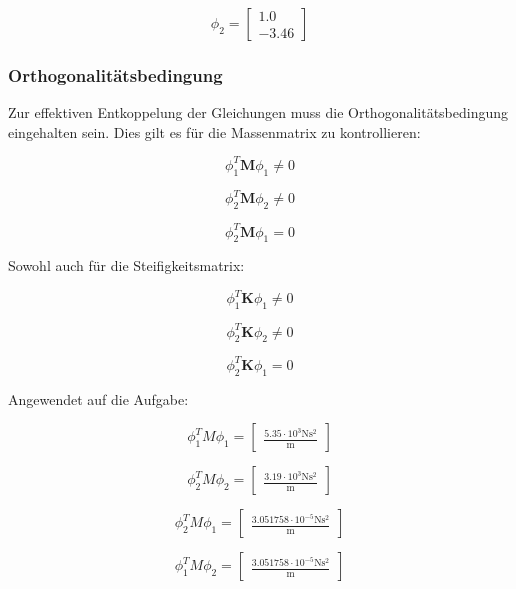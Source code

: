 \documentclass[
  letterpaper,
  DIV=11]{scrreprt}
\begin{document}
\begin{equation*}\phi_{2} = \left[\begin{matrix}1.0\\-3.46\end{matrix}\right]\end{equation*}

\hypertarget{orthogonalituxe4tsbedingung-1}{%
\subsubsection{Orthogonalitätsbedingung}\label{orthogonalituxe4tsbedingung-1}}

Zur effektiven Entkoppelung der Gleichungen muss die
Orthogonalitätsbedingung eingehalten sein. Dies gilt es für die
Massenmatrix zu kontrollieren:

\[\phi_1^T \mathbf{ M } \phi_1 \neq 0\]

\[\phi_2^T \mathbf{ M } \phi_2 \neq 0\]

\[\phi_2^T \mathbf{ M } \phi_1 = 0\]

Sowohl auch für die Steifigkeitsmatrix:

\[\phi_1^T \mathbf{ K } \phi_1 \neq 0\]

\[\phi_2^T \mathbf{ K } \phi_2 \neq 0\]

\[\phi_2^T \mathbf{ K } \phi_1 = 0\]

Angewendet auf die Aufgabe:

\begin{equation*}\phi_{1}^{T} M \phi_{1} = \left[\begin{matrix}\frac{5.35 \cdot 10^{3} \text{N} \text{s}^{2}}{\text{m}}\end{matrix}\right]\end{equation*}

\begin{equation*}\phi_{2}^{T} M \phi_{2} = \left[\begin{matrix}\frac{3.19 \cdot 10^{3} \text{N} \text{s}^{2}}{\text{m}}\end{matrix}\right]\end{equation*}

\begin{equation*}\phi_{2}^{T} M \phi_{1} = \left[\begin{matrix}\frac{3.051758 \cdot 10^{-5} \text{N} \text{s}^{2}}{\text{m}}\end{matrix}\right]\end{equation*}

\begin{equation*}\phi_{1}^{T} M \phi_{2} = \left[\begin{matrix}\frac{3.051758 \cdot 10^{-5} \text{N} \text{s}^{2}}{\text{m}}\end{matrix}\right]\end{equation*}
\end{document}
